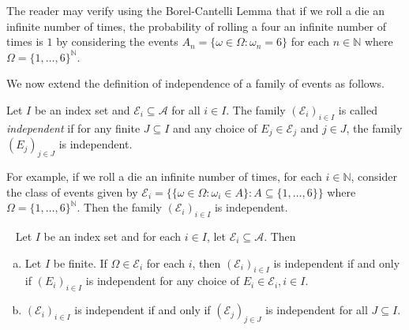 The reader may verify using the Borel-Cantelli Lemma that if we roll a die an infinite number of times, the probability of rolling a four an infinite number of times is $1$ by considering the events $A_n = \{\omega\in\Omega:\omega_n=6\}$ for each $n\in\mathbb{N}$ where $\Omega=\{1,\ldots,6\}^\mathbb{N}$.

\vspace{2mm}
We now extend the definition of independence of a family of events as follows.

\begin{definition}
\label{independence of classes of events}
    Let $I$ be an index set and $\mathcal{E}_i\subseteq\mathcal{A}$ for all $i\in I$. The family $(\mathcal{E}_i)_{i\in I}$ is called \textit{independent} if for any finite $J\subseteq I$ and any choice of $E_j\in\mathcal{E}_j$ and $j\in J$, the family $(E_j)_{j\in J}$ is independent.
\end{definition}

For example, if we roll a die an infinite number of times, for each $i\in\mathbb{N}$, consider the class of events given by $\mathcal{E}_i=\{\{\omega\in\Omega:\omega_i\in A\}:A\subseteq\{1,\ldots,6\}\}$
where $\Omega=\{1,\ldots,6\}^\mathbb{N}$. Then the family $(\mathcal{E}_i)_{i\in I}$ is independent.

\begin{theorem}
~
    Let $I$ be an index set and for each $i\in I$, let $\mathcal{E}_i\subseteq \mathcal{A}$. Then
    \begin{enumerate}[(a)]
        \item Let $I$ be finite. If $\Omega\in\mathcal{E}_i$ for each $i$, then $(\mathcal{E}_i)_{i\in I}$ is independent if and only if $(E_i)_{i\in I}$ is independent for any choice of $E_i\in\mathcal{E}_i,i\in I$.
        
        \item $(\mathcal{E}_i)_{i\in I}$ is independent if and only if $(\mathcal{E}_j)_{j\in J}$ is independent for all $J\subseteq I$.
        
        
    \end{enumerate}
\end{theorem}

